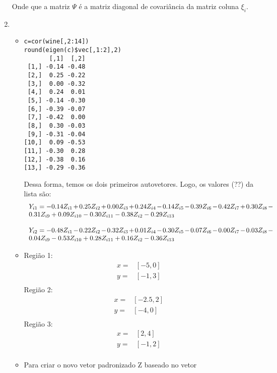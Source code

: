 \documentclass[11pt,a4paper]{book}
\begin{document}
\begin{enumerate}
			 Onde que a matriz $\Psi$ é a matriz diagonal de covariância da matriz coluna $\xi_i$.
			 
			 \item
			 	\begin{itemize}
			 	
			 	Primeiro devemos achar os autovetores da matriz de correlação X.
				Para isso, fiz as seguintes operações:
					\item
				\begin{lstlisting}
c=cor(wine[,2:14])
round(eigen(c)$vec[,1:2],2)
       [,1]  [,2]
 [1,] -0.14 -0.48
 [2,]  0.25 -0.22
 [3,]  0.00 -0.32
 [4,]  0.24  0.01
 [5,] -0.14 -0.30
 [6,] -0.39 -0.07
 [7,] -0.42  0.00
 [8,]  0.30 -0.03
 [9,] -0.31 -0.04
[10,]  0.09 -0.53
[11,] -0.30  0.28
[12,] -0.38  0.16
[13,] -0.29 -0.36
				\end{lstlisting}
				Dessa forma, temos os dois primeiros autovetores.
				Logo, os valores (??) da lista são:
				\begin{eqnarray*}
					\begin{tabular}{p{13cm}}
					$Y_{i1}=-0.14Z_{i1}+0.25Z_{i2}+0.00Z_{i3}+0.24Z_{i4}-0.14Z_{i5}-0.39Z_{i6}-0.42Z_{i7}+0.30Z_{i8}-0.31Z_{i9}+0.09Z_{i10}-0.30Z_{i11}-0.38Z_{i2}-0.29Z_{i13}$\\
					\\
					$Y_{i2}=-0.48Z_{i1}-0.22Z_{i2}-0.32Z_{i3}+0.01Z_{i4}-0.30Z_{i5}-0.07Z_{i6}-0.00Z_{i7}-0.03Z_{i8}-0.04Z_{i9}-0.53Z_{i10}+0.28Z_{i11}+0.16Z_{i2}-0.36Z_{i13}$\\
					\end{tabular}
				\end{eqnarray*}
					\item
				Região 1:
				\begin{eqnarray*}
					x=&[-5,0]\\
					y=&[-1,3]\\
				\end{eqnarray*}
				Região 2:
				\begin{eqnarray*}
					x=&[-2.5,2]\\
					y=&[-4,0]\\
				\end{eqnarray*}
				Região 3:
				\begin{eqnarray*}
					x=&[2,4]\\
					y=&[-1,2]\\
				\end{eqnarray*}
				\item
				Para criar o novo vetor padronizado Z baseado no vetor
				

\end{itemize}
\end{enumerate}
\end{document}

